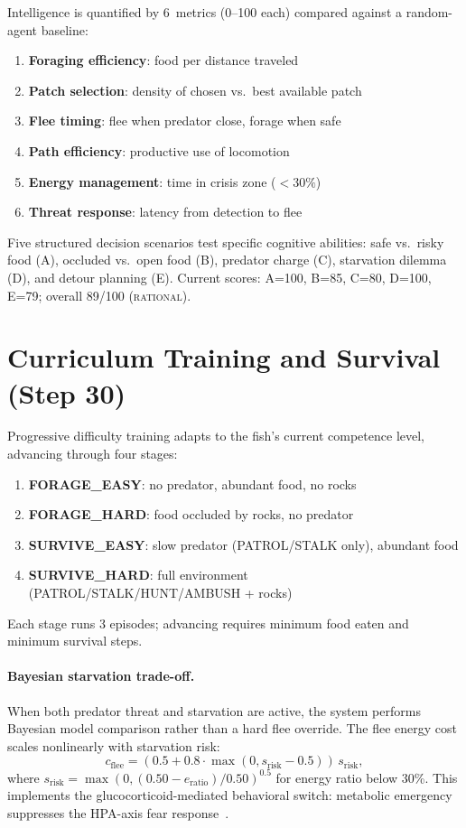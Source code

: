 \documentclass[11pt,a4paper]{article}
\begin{document}
Intelligence is quantified by 6~metrics (0--100 each) compared against
a random-agent baseline:
\begin{enumerate}[nosep]
  \item \textbf{Foraging efficiency}: food per distance traveled
  \item \textbf{Patch selection}: density of chosen vs.\ best available patch
  \item \textbf{Flee timing}: flee when predator close, forage when safe
  \item \textbf{Path efficiency}: productive use of locomotion
  \item \textbf{Energy management}: time in crisis zone ($<30\%$)
  \item \textbf{Threat response}: latency from detection to flee
\end{enumerate}

Five structured decision scenarios test specific cognitive abilities:
safe vs.\ risky food (A), occluded vs.\ open food (B), predator charge
(C), starvation dilemma (D), and detour planning (E).
Current scores: A=100, B=85, C=80, D=100, E=79; overall 89/100
(\textsc{rational}).

\section{Curriculum Training and Survival (Step 30)}\label{sec:curriculum_survival}

Progressive difficulty training adapts to the fish's current
competence level, advancing through four stages:
\begin{enumerate}[nosep]
  \item \textbf{FORAGE\_EASY}: no predator, abundant food, no rocks
  \item \textbf{FORAGE\_HARD}: food occluded by rocks, no predator
  \item \textbf{SURVIVE\_EASY}: slow predator (PATROL/STALK only), abundant food
  \item \textbf{SURVIVE\_HARD}: full environment (PATROL/STALK/HUNT/AMBUSH + rocks)
\end{enumerate}
Each stage runs 3 episodes; advancing requires minimum food eaten and
minimum survival steps.

\paragraph{Bayesian starvation trade-off.}
When both predator threat and starvation are active, the system performs
Bayesian model comparison rather than a hard flee override.
The flee energy cost scales nonlinearly with starvation risk:
\begin{equation}\label{eq:flee_energy_cost}
  c_\text{flee} = (0.5 + 0.8\cdot\max(0, s_\text{risk} - 0.5))\,s_\text{risk},
\end{equation}
where $s_\text{risk} = \max(0, (0.50 - e_\text{ratio})/0.50)^{0.5}$ for
energy ratio below 30\%.  This implements the glucocorticoid-mediated
behavioral switch: metabolic emergency suppresses the HPA-axis fear
response~\cite{wendelaar1997}.
\end{document}
